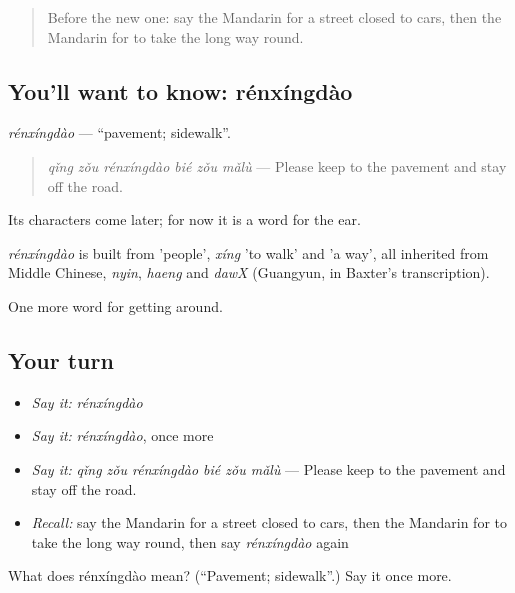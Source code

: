 \label{lesson:ZH-C447-renxingdao}



\begin{quote}
Before the new one: say the Mandarin for a street closed to cars, then the Mandarin for to take the long way round.
\end{quote}

\subsection*{You'll want to know: rénxíngdào}
\emph{rénxíngdào} — \textquotedblleft{}pavement; sidewalk\textquotedblright{}.

\begin{quote}
\emph{qǐng zǒu rénxíngdào bié zǒu mǎlù} — Please keep to the pavement and stay off the road.
\end{quote}

Its characters come later; for now it is a word for the ear.

\begin{cousinweb}
\emph{rénxíngdào} is built from  'people', \emph{xíng} 'to walk' and  'a way', all inherited from Middle Chinese, \emph{nyin}, \emph{haeng} and \emph{dawX} (Guangyun, in Baxter's transcription).
\end{cousinweb}

\begin{grammarlens}[title={What you've built}]
One more word for getting around.
\end{grammarlens}

\subsection*{Your turn}
\begin{itemize}
\raggedright
  \item \emph{Say it:} \emph{rénxíngdào}
  \item \emph{Say it:} \emph{rénxíngdào}, once more
  \item \emph{Say it:} \emph{qǐng zǒu rénxíngdào bié zǒu mǎlù} — Please keep to the pavement and stay off the road.
  \item \emph{Recall:} say the Mandarin for a street closed to cars, then the Mandarin for to take the long way round, then say \emph{rénxíngdào} again
\end{itemize}

\begin{tcolorbox}[breakable,colback=teal!4,colframe=teal!35!black,title={Before you move on}]
What does rénxíngdào mean? (\textquotedblleft{}Pavement; sidewalk\textquotedblright{}.) Say it once more.
\end{tcolorbox}
